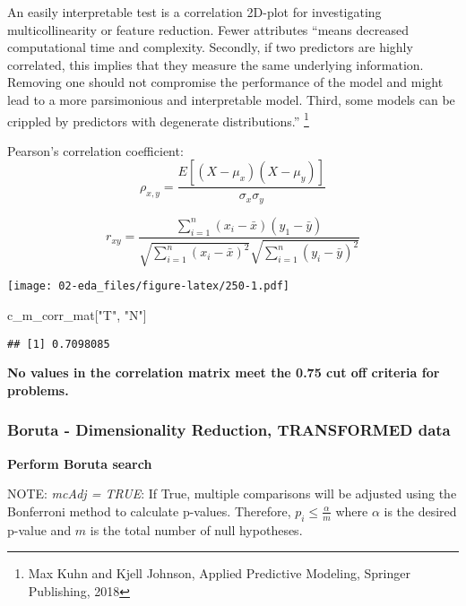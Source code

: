 \documentclass[]{article}
\newenvironment{Shaded}{\begin{snugshade}}{\end{snugshade}}
\newcommand{\NormalTok}[1]{#1}
\newcommand{\StringTok}[1]{\textcolor[rgb]{0.31,0.60,0.02}{#1}}
\begin{document}
An easily interpretable test is a correlation 2D-plot for investigating
multicollinearity or feature reduction. Fewer attributes ``means
decreased computational time and complexity. Secondly, if two predictors
are highly correlated, this implies that they measure the same
underlying information. Removing one should not compromise the
performance of the model and might lead to a more parsimonious and
interpretable model. Third, some models can be crippled by predictors
with degenerate distributions.'' \footnote{Max Kuhn and Kjell Johnson,
  Applied Predictive Modeling, Springer Publishing, 2018}

Pearson's correlation coefficient: \begin{equation} 
\rho_{x,y} = \frac {E \left[(X - \mu_x)(X - \mu_y) \right]} {\sigma_x \sigma_y}
\end{equation}

\begin{equation} 
r_{xy} = \frac {\sum^n_{i=1} (x_i - \bar x)(y_1 - \bar y)} { {\sqrt {\sum^n_{i=1} (x_i - \bar x)^2 }} {\sqrt {\sum^n_{i=1} (y_i - \bar y)^2 }} }
\end{equation}

\texttt{[image: 02-eda\_files/figure-latex/250-1.pdf]}

\begin{Shaded}
\begin{Highlighting}[]
\NormalTok{c_m_corr_mat[}\StringTok{"T"}\NormalTok{, }\StringTok{"N"}\NormalTok{]}
\end{Highlighting}
\end{Shaded}

\begin{verbatim}
## [1] 0.7098085
\end{verbatim}

\textbf{No values in the correlation matrix meet the 0.75 cut off
criteria for problems.}

\hypertarget{boruta---dimensionality-reduction-transformed-data}{%
\subsubsection{Boruta - Dimensionality Reduction, TRANSFORMED
data}\label{boruta---dimensionality-reduction-transformed-data}}

\textbf{Perform Boruta search}

NOTE: \emph{mcAdj = TRUE}: If True, multiple comparisons will be
adjusted using the Bonferroni method to calculate p-values. Therefore,
\(p_i \leq \frac {\alpha} {m}\) where \(\alpha\) is the desired p-value
and \(m\) is the total number of null hypotheses.
\end{document}
